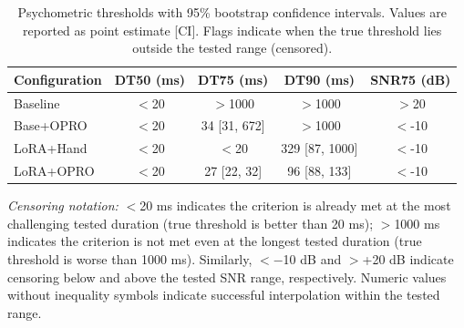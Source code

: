 \begin{table}[ht]
\centering
\caption{Psychometric thresholds with 95\% bootstrap confidence intervals. Values are reported as point estimate [CI]. Flags indicate when the true threshold lies outside the tested range (censored).}
\label{tab:psychometric_thresholds}
\begin{tabular}{lcccc}
\toprule
\textbf{Configuration} & \textbf{DT50 (ms)} & \textbf{DT75 (ms)} & \textbf{DT90 (ms)} & \textbf{SNR75 (dB)} \\
\midrule
Baseline & $<$20 & $>$1000 & $>$1000 & $>$20 \\
Base+OPRO & $<$20 & 34 [31, 672] & $>$1000 & $<$-10 \\
LoRA+Hand & $<$20 & $<$20 & 329 [87, 1000] & $<$-10 \\
LoRA+OPRO & $<$20 & 27 [22, 32] & 96 [88, 133] & $<$-10 \\
\bottomrule
\end{tabular}

\vspace{0.4em}
\begin{flushleft}
\footnotesize
\textit{Censoring notation:} $<$20 ms indicates the criterion is already met at the most challenging tested duration (true threshold is better than 20 ms); $>$1000 ms indicates the criterion is not met even at the longest tested duration (true threshold is worse than 1000 ms). Similarly, $<$$-$10 dB and $>$+20 dB indicate censoring below and above the tested SNR range, respectively. Numeric values without inequality symbols indicate successful interpolation within the tested range.
\end{flushleft}
\end{table}
